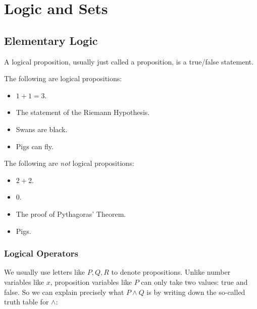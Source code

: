 \documentclass[../ium.tex]{subfiles}
\begin{document}
\chapter{Logic and Sets}

\section{Elementary Logic}

\begin{definition}[Proposition]
    \begin{shaded*}
        A logical proposition, usually just called a proposition, is a true/false statement.
    \end{shaded*}
\end{definition}
\begin{example}
    The following are logical propositions:
    \begin{itemize}
        \item $1+1=3$.
        \item The statement of the Riemann Hypothesis.
        \item Swans are black.
        \item Pigs can fly.
    \end{itemize}
\end{example}

\begin{example}
    The following are \textit{not} logical propositions:
    \begin{itemize}
        \item $2+2$.
        \item $0$.
        \item The proof of Pythagoras' Theorem.
        \item Pigs.
    \end{itemize}
\end{example}

\subsection{Logical Operators}

We usually use letters like $P,Q,R$ to denote propositions. Unlike number variables like $x$, proposition variables like $P$ can only take two values: true and false. So we can explain precisely what $P\land Q$ is by writing down the so-called truth table for $\land$:
\end{document}
